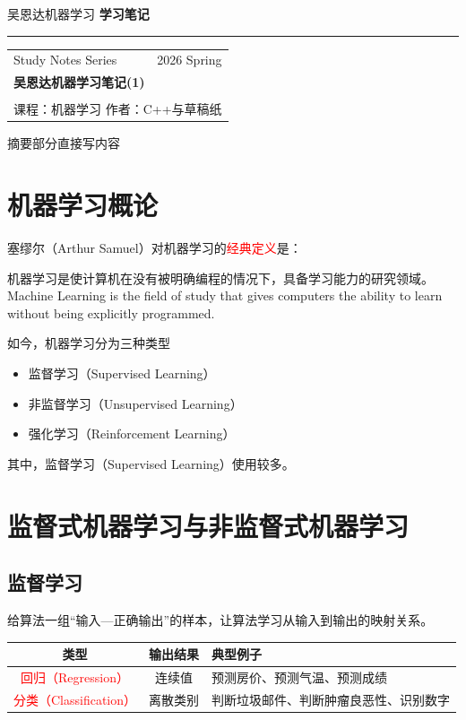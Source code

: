 \documentclass[12pt,a4paper]{ctexart}
\newcommand{\topbar}[2]{
  \noindent
  {\small\textcolor{MainColor}{#1}}
  \hfill
  {\small\bfseries\textcolor{TitleDark}{#2}}
  \par\vspace{0.35em}
  {\color{BorderGray}\hrule}
  \vspace{1.2em}
}
\newcommand{\notetitlecard}[6]{
\begin{tcolorbox}[
  enhanced,
  colback=white,
  colframe=BorderGray,
  boxrule=0.6pt,
  arc=2mm,
  left=12pt,
  right=12pt,
  top=10pt,
  bottom=10pt,
  borderline west={4pt}{0pt}{SecondColor}
]
\begin{tabularx}{\linewidth}{X r}
{\small\textcolor{TextGray}{#1}} & {\small\textcolor{TextGray}{#2}} \\[0.9em]
\multicolumn{2}{l}{
  {\Huge\bfseries\textcolor{MainColor}{#3}}
} \\[0.45em]
\multicolumn{2}{l}{
  {\large\textcolor{SecondColor!90!black}{#4}}
} \\[0.45em]
\multicolumn{2}{l}{
  {\small\textcolor{TextGray}{课程：#5 \qquad 作者：#6}}
}
\end{tabularx}
\end{tcolorbox}
\vspace{1em}
}
\begin{document}
\topbar{吴恩达机器学习}{学习笔记}

\notetitlecard
  {Study Notes Series}
  {2026 Spring}
  {吴恩达机器学习笔记(1)}
  {}
  {机器学习}
  {C++与草稿纸}

\begin{summarybox}
摘要部分直接写内容
\end{summarybox}

\section{机器学习概论}

\begin{definitionbox}[机器学习的定义]
塞缪尔（Arthur Samuel）对机器学习的\textcolor{red}{经典定义}是：

机器学习是使计算机在没有被明确编程的情况下，具备学习能力的研究领域。
\\
Machine Learning is the field of study
that gives computers the ability to learn
without being explicitly programmed.
\end{definitionbox}

\begin{keybox}[机器学习的类型]
如今，机器学习分为三种类型
\begin{itemize}
    \item 监督学习（Supervised Learning）
    \item 非监督学习（Unsupervised Learning）
    \item 强化学习（Reinforcement Learning）
\end{itemize}
其中，监督学习（Supervised Learning）使用较多。
\end{keybox}

\section{监督式机器学习与非监督式机器学习}
\subsection{监督学习}
\begin{definitionbox}[监督学习的关键特征]
给算法一组“输入—正确输出”的样本，让算法学习从输入到输出的映射关系。
\end{definitionbox}


\begin{examplebox}[监督学习的分类和用途]

\begin{center}
    \begin{tabularx}{\linewidth}{|c|c|X|}
        \hline
        类型 & 输出结果 & 典型例子 \\
        \hline
        \textcolor{red}{回归（Regression）} & 连续值 & 预测房价、预测气温、预测成绩 \\
        \hline
        \textcolor{red}{分类（Classification）} & 离散类别 & 判断垃圾邮件、判断肿瘤良恶性、识别数字 \\
        \hline
    \end{tabularx}
\end{center}
\end{examplebox}
\end{document}
